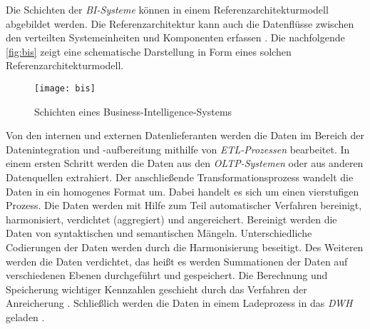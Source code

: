 Die Schichten der \textit{\acrshort{BI}-Systeme} können in einem Referenzarchitekturmodell abgebildet werden. 
Die Referenzarchitektur kann auch die Datenflüsse zwischen den verteilten Systemeinheiten und Komponenten erfassen \cite[vgl.][S. 126 ff.]{linden_geschaftsmodellbasierte_2016}.
Die nachfolgende \autoref{fig:bis} zeigt eine schematische Darstellung in Form eines solchen Referenzarchitekturmodell.

\begin{figure}[H]
    \centering
        \texttt{[image: bis]}
        \caption{Schichten eines Business-Intelligence-Systems}
        \label{fig:bis}
\end{figure}

Von den internen und externen Datenlieferanten werden die Daten im Bereich der Datenintegration und -aufbereitung mithilfe von \textit{\acrshort{ETL}-Prozessen} bearbeitet. 
In einem ersten Schritt werden die Daten aus den \textit{\acrshort{OLTP}-Systemen} oder aus anderen Datenquellen extrahiert. 
Der anschließende Transformationsprozess wandelt die Daten in ein homogenes Format um. Dabei handelt es sich um einen vierstufigen Prozess. Die Daten werden mit Hilfe 
zum Teil automatischer Verfahren bereinigt, harmonisiert, verdichtet (aggregiert) und angereichert.
Bereinigt werden die Daten von syntaktischen und semantischen Mängeln. Unterschiedliche Codierungen der Daten werden durch die Harmonisierung 
beseitigt. Des Weiteren werden die Daten verdichtet, das heißt es werden Summationen der Daten auf verschiedenen Ebenen durchgeführt und gespeichert. 
Die Berechnung und Speicherung wichtiger Kennzahlen geschieht durch das Verfahren der Anreicherung \cites[vgl.][86]{gronwald_integrierte_2020}[vgl.][S. 277 f.]{abts_grundkurs_2017}.
Schließlich werden die Daten in einem Ladeprozess in das \textit{\acrlong{DWH}} geladen \cite[vgl.][S. 129 ff.]{linden_geschaftsmodellbasierte_2016}. 

